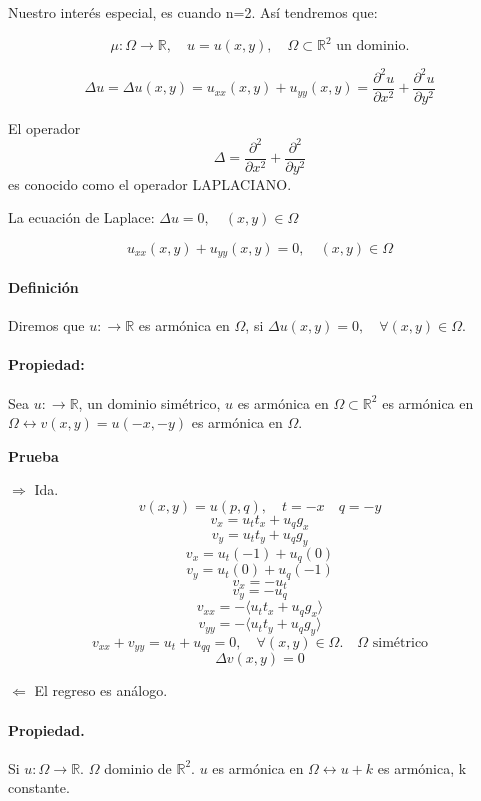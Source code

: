 \documentclass[a4paper,12pt]{article}
\begin{document}
Nuestro interés especial, es cuando n=2. Así tendremos que:

$$\mu: \Omega \rightarrow \mathbb{R}, \quad u = u(x, y), \quad \Omega \subset \mathbb{R}^2 \text{ un dominio}.$$

$$\Delta u = \Delta u(x, y) = u_{xx}(x, y) + u_{yy}(x, y) = \frac{\partial^2 u}{\partial x^2} + \frac{\partial^2 u}{\partial y^2}$$

El operador $$\Delta = \frac{\partial^2}{\partial x^2} + \frac{\partial^2}{\partial y^2}$$ es conocido como el operador LAPLACIANO.

La ecuación de Laplace: $\Delta u = 0, \quad (x, y) \in \Omega$

$$u_{xx}(x, y) + u_{yy}(x, y) = 0, \quad (x, y) \in \Omega$$

\paragraph{Definición} Diremos que $u: \rightarrow \mathbb{R}$ es armónica en $\Omega$, si $\Delta u(x, y) = 0, \quad \forall (x, y) \in \Omega$.

\paragraph{Propiedad:}

Sea $u: \rightarrow \mathbb{R}$, un dominio simétrico, $u$ es armónica en $\Omega \subset \mathbb{R}^2$ es armónica en $\Omega \leftrightarrow v(x, y) = u(-x, -y)$ es armónica en $\Omega$.

\textbf{Prueba}

$\Rightarrow$ Ida.
$$v(x, y) = u(p, q), \quad t = -x \quad q = -y$$
$$v_x = u_t t_x + u_q g_x$$
$$v_y = u_t t_y + u_q g_y$$
$$v_x = u_t(-1) + u_q(0)$$
$$v_y = u_t(0) + u_q(-1)$$
$$v_x = -u_t$$
$$v_y = -u_q$$
$$v_{xx} = -\langle u_t t_x + u_q g_x \rangle$$
$$v_{yy} = -\langle u_t t_y + u_q g_y \rangle$$
$$v_{xx} + v_{yy} = u_t + u_{qq} = 0, \quad \forall (x, y) \in \Omega. \quad \Omega \text{ simétrico}$$
$$\Delta v(x, y) = 0$$

$\Leftarrow$ El regreso es análogo.



\paragraph{Propiedad.}

Si $u: \Omega \rightarrow \mathbb{R}$. $\Omega$ dominio de $\mathbb{R}^2$.
$u$ es armónica en $\Omega \leftrightarrow u + k$ es armónica, k constante.
\end{document}

